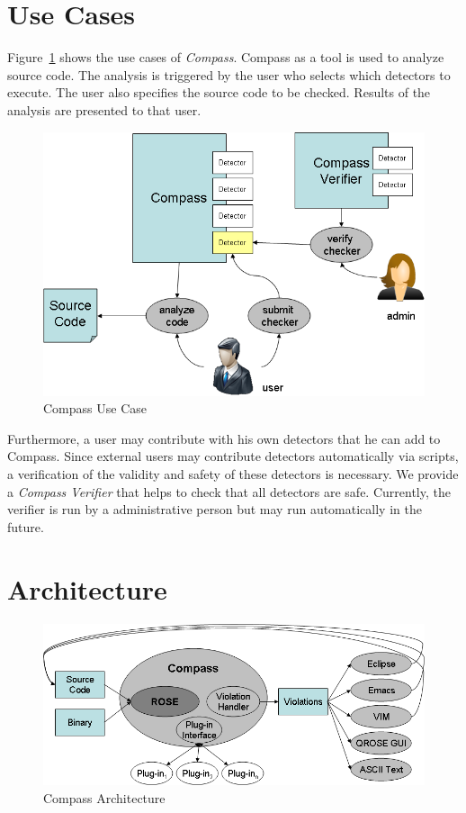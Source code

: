 \section{Use Cases}

\label{design::UseCase}

Figure~\ref{Compass_usecase} shows the use cases of \emph{Compass}.
Compass as a tool is used to analyze source code. The analysis is triggered by the user who
selects which detectors to execute. The user also specifies the source code to be checked.
Results of the analysis are presented to that user.

\begin{figure}[th]
\includegraphics[width=4.5in]{compass_pic.png}
\caption{Compass Use Case}
\label{Compass_usecase}
\end{figure}

Furthermore, a user may contribute with his own detectors that he can add to Compass. Since 
external users may contribute detectors automatically via scripts, a verification of the 
validity and safety of these detectors is necessary. We provide a \emph{Compass Verifier}
that helps to check that all detectors are safe. Currently, the verifier is run by
a administrative person but may run automatically in the future.



\section{Architecture}

\begin{figure}[thb]
\includegraphics[width=6.0in]{compass_arc.png}
\caption{Compass Architecture}
\label{CompassArchitecture}
\end{figure}


